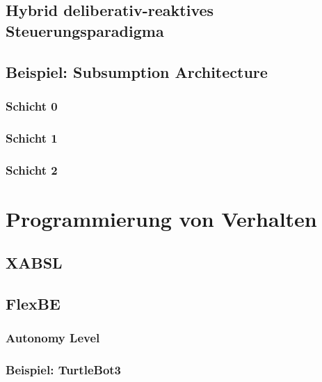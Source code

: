 \documentclass[a4paper, 11pt, accentcolor = tud3b]{tudreport}
\begin{document}
			\subsection{Hybrid deliberativ-reaktives Steuerungsparadigma} %

			\subsection{Beispiel: Subsumption Architecture} %

				\subsubsection{Schicht 0} %

				\subsubsection{Schicht 1} %

				\subsubsection{Schicht 2} %

		\section{Programmierung von Verhalten} %

			\subsection{XABSL} %

			\subsection{FlexBE} %

				\subsubsection{Autonomy Level} %

				\subsubsection{Beispiel: TurtleBot3} %
\end{document}
